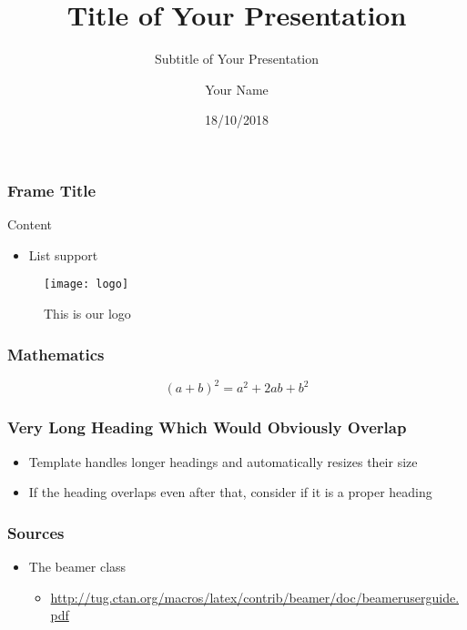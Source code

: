 \documentclass{beamer}
\title[Short Title]{Title of Your Presentation}
\subtitle{Subtitle of Your Presentation}
\author{Your Name}
\date{18/10/2018}
\begin{document}

\begin{frame}
  \frametitle{Frame Title}

  Content

  \begin{itemize}
    \item List support
  \end{itemize}

  \begin{figure}
      \texttt{[image: logo]}
      \caption{This is our logo}
      \label{fig:logo}
  \end{figure}

\end{frame}

\begin{frame}
  \frametitle{Mathematics}

  \[
    (a + b)^2 = a^2 + 2ab + b^2
  \]

\end{frame}

%
%
%
%

\begin{frame}
  \frametitle{Very Long Heading Which Would Obviously Overlap}

  \begin{itemize}
    \item Template handles longer headings and automatically resizes their size
    \item If the heading overlaps even after that, consider if it is a proper heading
  \end{itemize}

\end{frame}

\begin{frame}
  \frametitle{Sources}

  \begin{itemize}
    \item The beamer class
    \begin{itemize}
      \item \url{http://tug.ctan.org/macros/latex/contrib/beamer/doc/beameruserguide.pdf}
    \end{itemize}
  \end{itemize}

\end{frame}
\end{document}
